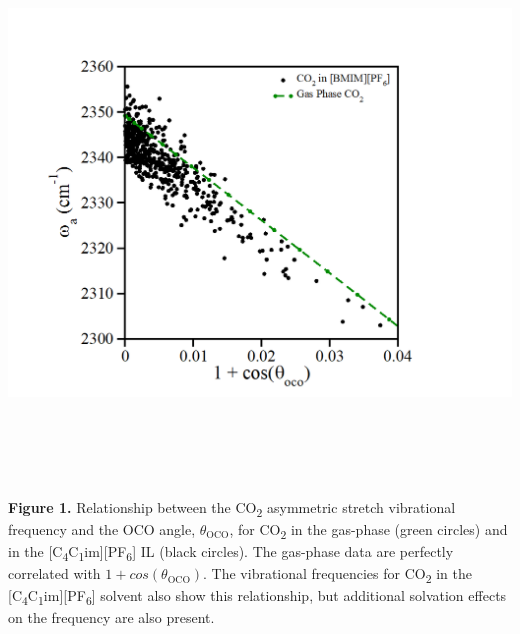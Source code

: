 \documentclass[]{article}
\begin{document}
\emph{\\
}

\includegraphics[width=6.43125in,height=5.7659in]{figure1.png}

\textbf{Figure 1.} Relationship between the CO\textsubscript{2}
asymmetric stretch vibrational frequency and the OCO angle,
\(\theta_{\text{OCO}}\), for CO\textsubscript{2} in the gas-phase (green
circles) and in the
{[}C\textsubscript{4}C\textsubscript{1}im{]}{[}PF\textsubscript{6}{]} IL
(black circles). The gas-phase data are perfectly correlated with
\(1 + cos(\theta_{\text{OCO}})\). The vibrational frequencies for
CO\textsubscript{2} in the
{[}C\textsubscript{4}C\textsubscript{1}im{]}{[}PF\textsubscript{6}{]}
solvent also show this relationship, but additional solvation effects on
the frequency are also present.
\end{document}
